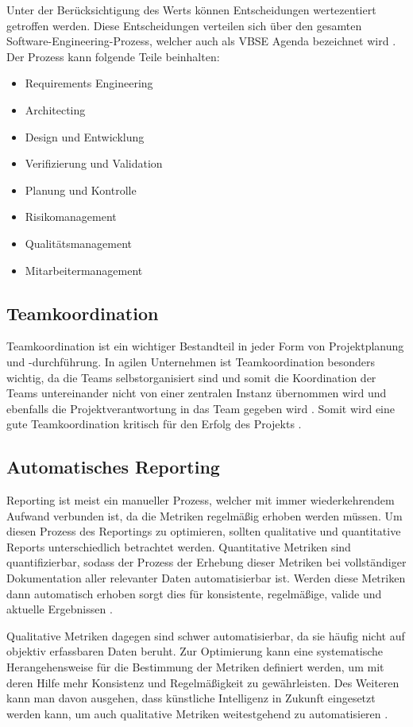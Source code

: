 Unter der Berücksichtigung des Werts können Entscheidungen wertezentiert getroffen werden. Diese Entscheidungen verteilen sich über den gesamten Software-Engineering-Prozess, welcher auch  als VBSE Agenda bezeichnet wird \cite{}.
Der Prozess kann folgende Teile beinhalten:
\begin{itemize}
  \item Requirements Engineering
  \item Architecting
  \item Design und Entwicklung
  \item Verifizierung und Validation
  \item Planung und Kontrolle
  \item Risikomanagement
  \item Qualitätsmanagement
  \item Mitarbeitermanagement
\end{itemize}

\subsection{Teamkoordination}
Teamkoordination ist ein wichtiger Bestandteil in jeder Form von Projektplanung und -durchführung. In agilen Unternehmen ist Teamkoordination besonders wichtig, da die Teams selbstorganisiert sind und somit die Koordination der Teams untereinander nicht von einer zentralen Instanz übernommen wird und ebenfalls die Projektverantwortung in das Team gegeben wird \cite{}.
Somit wird eine gute Teamkoordination kritisch für den Erfolg des Projekts \cite{}.

\subsection{Automatisches Reporting}
Reporting ist meist ein manueller Prozess, welcher mit immer wiederkehrendem Aufwand verbunden ist, da die Metriken regelmäßig erhoben werden müssen. Um diesen Prozess des Reportings zu optimieren, sollten qualitative und quantitative Reports unterschiedlich betrachtet werden.
Quantitative Metriken sind quantifizierbar, sodass der Prozess der Erhebung dieser Metriken bei vollständiger Dokumentation aller relevanter Daten automatisierbar ist. Werden diese Metriken dann automatisch erhoben sorgt dies für konsistente, regelmäßige, valide und aktuelle Ergebnissen \cite{}.

Qualitative Metriken dagegen sind schwer automatisierbar, da sie häufig nicht auf objektiv erfassbaren Daten beruht. Zur Optimierung kann eine systematische Herangehensweise für die Bestimmung der Metriken definiert werden, um mit deren Hilfe  mehr Konsistenz und Regelmäßigkeit zu gewährleisten. Des Weiteren kann man davon ausgehen, dass künstliche Intelligenz in Zukunft eingesetzt werden kann, um auch qualitative Metriken weitestgehend zu automatisieren \cite{}.

